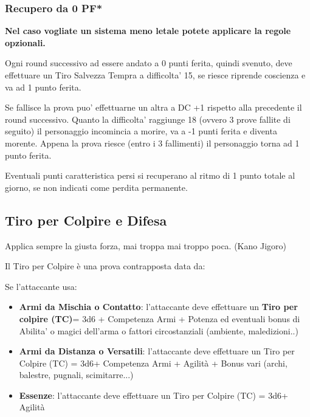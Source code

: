 \documentclass[a4paper,11pt,twoside,openany]{book}
\begin{document}
\subsubsection{Recupero da 0 PF*}  

\textbf{Nel caso vogliate un sistema meno letale potete applicare la regole opzionali.}

Ogni round successivo ad essere andato a 0 punti ferita, quindi svenuto, deve effettuare un Tiro Salvezza Tempra a difficolta’ 15, se riesce riprende coscienza e va ad 1 punto ferita.

Se fallisce la prova puo’ effettuarne un altra a DC +1 rispetto alla precedente il round successivo. Quanto la difficolta’ raggiunge 18 (ovvero 3 prove fallite di seguito) il personaggio incomincia a morire, va a -1 punti ferita e diventa morente.
Appena la prova riesce (entro i 3 fallimenti) il personaggio torna ad 1 punto ferita.

Eventuali punti caratteristica persi si recuperano al ritmo di 1 punto totale al giorno, se non indicati come perdita permanente.

\pagebreak

\subsection{Tiro per Colpire e Difesa}

\label{tiro-per-colpire}
\begin{tcolorbox}[enhanced,arc=5pt,boxrule=0.3pt]{Applica sempre la giusta forza, mai troppa mai troppo poca. (Kano Jigoro)}\end{tcolorbox}\medskip

Il Tiro per Colpire è una prova contrapposta data da:

Se l'attaccante usa:

\begin{itemize}
	\item \textbf{Armi da Mischia o Contatto}: l'attaccante deve effettuare un \textbf{Tiro per colpire (TC)}= 3d6 + Competenza Armi + Potenza ed eventuali bonus di Abilita' o magici dell'arma o fattori circostanziali (ambiente, maledizioni..)
	
	\item
	\textbf{Armi da Distanza o Versatili}: l'attaccante deve effettuare un Tiro per Colpire (TC) = 3d6+ Competenza Armi + Agilità + Bonus vari (archi, balestre, pugnali, scimitarre...)
	
	\item	\textbf{Essenze}: l'attaccante deve effettuare un Tiro per Colpire (TC) = 3d6+ Agilità
\end{itemize}
\end{document}
